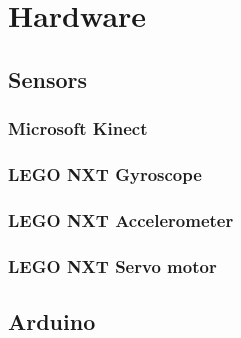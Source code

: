 \chapter{Hardware}
\label{chap:Hardware}

\section{Sensors}
\label{sec:Sensors}

\subsection{Microsoft Kinect}
\label{sec:Microsoft Kinect}

\subsection{LEGO NXT Gyroscope}
\label{sec:LEGO NXT Gyroscope}

\subsection{LEGO NXT Accelerometer}
\label{sec:LEGO NXT Accelerometer}

\subsection{LEGO NXT Servo motor}
\label{sec:LEGO NXT Servo motor}

\section{Arduino}
\label{sec:Arduino}
